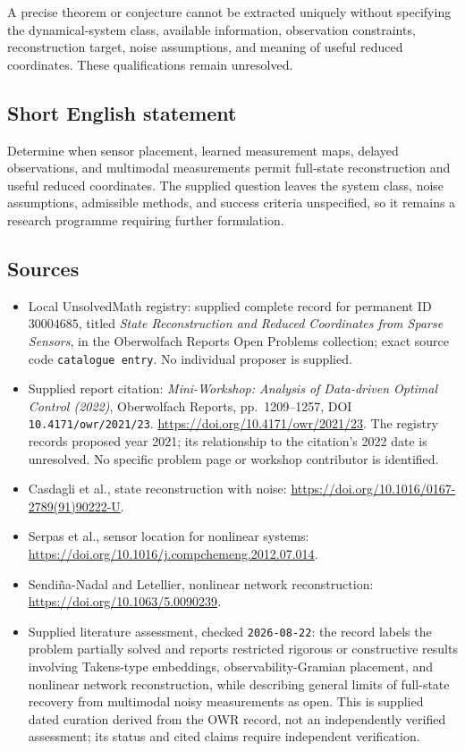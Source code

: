 \documentclass[11pt]{article}
\begin{document}
A precise theorem or conjecture cannot be extracted uniquely without specifying the dynamical-system class, available information, observation constraints, reconstruction target, noise assumptions, and meaning of useful reduced coordinates. These qualifications remain unresolved.
\subsection{Short English statement}
Determine when sensor placement, learned measurement maps, delayed observations, and multimodal measurements permit full-state reconstruction and useful reduced coordinates. The supplied question leaves the system class, noise assumptions, admissible methods, and success criteria unspecified, so it remains a research programme requiring further formulation.
\subsection{Sources}
\begin{itemize}
\item Local UnsolvedMath registry: supplied complete record for permanent ID \(30004685\), titled \emph{State Reconstruction and Reduced Coordinates from Sparse Sensors}, in the Oberwolfach Reports Open Problems collection; exact source code \texttt{catalogue entry}. No individual proposer is supplied.
\item Supplied report citation: \emph{Mini-Workshop: Analysis of Data-driven Optimal Control (2022)}, Oberwolfach Reports, pp.\ 1209--1257, DOI \texttt{10.4171/owr/2021/23}. \url{https://doi.org/10.4171/owr/2021/23}. The registry records proposed year 2021; its relationship to the citation's 2022 date is unresolved. No specific problem page or workshop contributor is identified.
\item Casdagli et al., state reconstruction with noise: \url{https://doi.org/10.1016/0167-2789(91)90222-U}.
\item Serpas et al., sensor location for nonlinear systems: \url{https://doi.org/10.1016/j.compchemeng.2012.07.014}.
\item Sendiña-Nadal and Letellier, nonlinear network reconstruction: \url{https://doi.org/10.1063/5.0090239}.
\item Supplied literature assessment, checked \texttt{2026-08-22}: the record labels the problem partially solved and reports restricted rigorous or constructive results involving Takens-type embeddings, observability-Gramian placement, and nonlinear network reconstruction, while describing general limits of full-state recovery from multimodal noisy measurements as open. This is supplied dated curation derived from the OWR record, not an independently verified assessment; its status and cited claims require independent verification.
\end{itemize}
\end{document}
